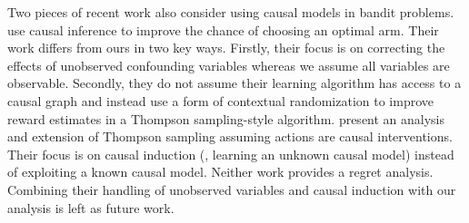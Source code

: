 
Two pieces of recent work also consider using causal models in bandit problems.
\citet{Bareinboim2015} use causal inference to improve the chance of choosing an optimal arm. Their work differs from ours in two key ways. Firstly, their focus is on correcting the effects of unobserved confounding variables whereas we assume all variables are observable. Secondly, they do not assume their learning algorithm has access to a causal graph and instead use a form of contextual randomization to improve reward estimates in a Thompson sampling-style algorithm. \citet{Ortega2014thompson} present an analysis and extension of Thompson sampling assuming actions are causal interventions. Their focus is on causal induction (\ie, learning an unknown causal model) instead of exploiting a known causal model. Neither work provides a regret analysis. 
Combining their handling of unobserved variables and causal induction with our analysis is left as future work.


